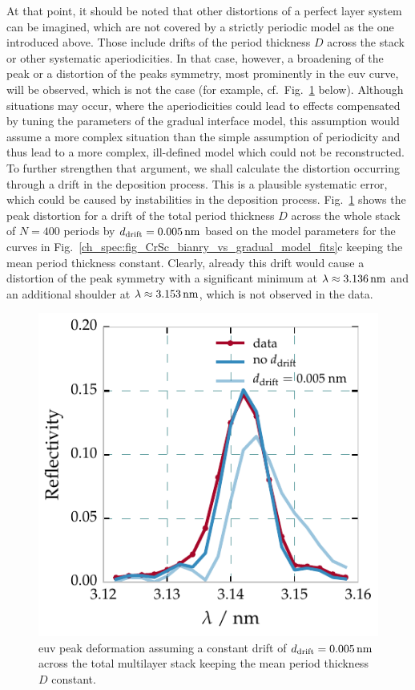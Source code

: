 At that point, it should be noted that other distortions of a perfect layer system can be imagined, which are not covered by a strictly periodic model as the one introduced above. Those include drifts of the period thickness $D$ across the stack or other systematic aperiodicities. In that case, however, a broadening of the peak or a distortion of the peaks symmetry, most prominently in the \gls{euv} curve, will be observed, which is not the case (for example, cf.~Fig.~\ref{ch_spec:fig_CrSc_drift} below). Although situations may occur, where the aperiodicities could lead to effects compensated by tuning the parameters of the gradual interface model, this assumption would assume a more complex situation than the simple assumption of periodicity and thus lead to a more complex, ill-defined model which could not be reconstructed.
To further strengthen that argument, we shall calculate the distortion occurring through a drift in the deposition process. This is a plausible systematic error, which could be caused by instabilities in the deposition process. Fig.~\ref{ch_spec:fig_CrSc_drift} shows the peak distortion for a drift of the total period thickness $D$ across the whole stack of $N=400$ periods by $d_\text{drift} = \nm{0.005}$ based on the model parameters for the curves in Fig.~\ref{ch_spec:fig_CrSc_bianry_vs_gradual_model_fits}c keeping the mean period thickness constant. Clearly, already this drift would cause a distortion of the peak symmetry with a significant minimum at $\lambda \approx \nm{3.136}$ and an additional shoulder at $\lambda \approx \nm{3.153}$, which is not observed in the data.
\begin{figure}[htbp]
  \centering
  \includegraphics{img/CrSc_drift}
  \caption[EUV peak deformation assuming a constant drift in the Cr/Sc period thickness.]{\Gls{euv} peak deformation assuming a constant drift of $d_\text{drift} = \nm{0.005}$ across the total multilayer stack keeping the mean period thickness $D$ constant.}
  \label{ch_spec:fig_CrSc_drift}
\end{figure}

